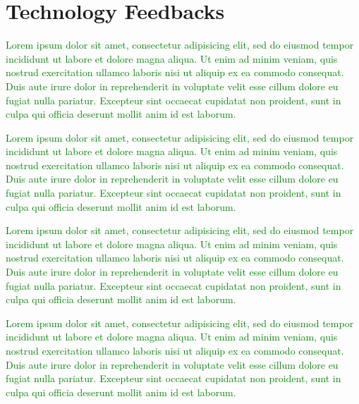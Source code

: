 \documentclass{sig-alternate}
\newcommand{\lorem}               {\textcolor{green}{Lorem ipsum dolor sit amet, consectetur adipisicing elit, sed do eiusmod tempor incididunt ut labore et dolore magna aliqua. Ut enim ad minim veniam, quis nostrud exercitation ullamco laboris nisi ut aliquip ex ea commodo consequat. Duis aute irure dolor in reprehenderit in voluptate velit esse cillum dolore eu fugiat nulla pariatur. Excepteur sint occaecat cupidatat non proident, sunt in culpa qui officia deserunt mollit anim id est laborum.}}
\begin{document}
\section{Technology Feedbacks}
\label{sec:technology}


\lorem


\lorem


\lorem


\lorem






\end{document}

